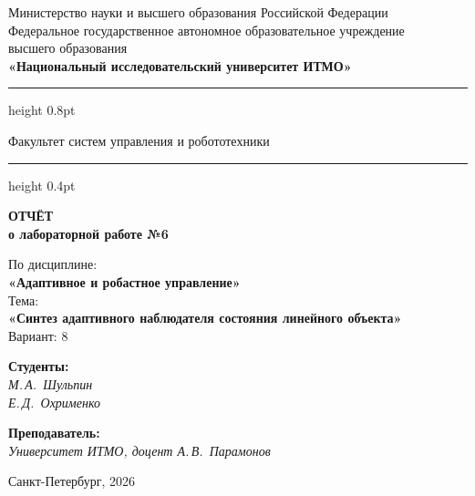 \documentclass[a4paper,12pt]{article}
\begin{document}
	
	\begin{titlepage}
		\centering
		
		\vspace*{0.5cm}
		{\small
			Министерство науки и высшего образования Российской Федерации\\[2pt]
			Федеральное государственное автономное образовательное учреждение\\
			высшего образования\\[2pt]
			\textbf{«Национальный исследовательский университет ИТМО»}\\
		}
		
		\vspace{0.8cm}
		\hrule height 0.8pt
		\vspace{0.3cm}
		
		{\large Факультет систем управления и робототехники}
		
		\vspace{0.3cm}
		\hrule height 0.4pt
		\vspace{2.5cm}
		
		{\Huge\bfseries ОТЧЁТ}\\[0.4cm]
		{\LARGE\bfseries о лабораторной работе №6}\\[0.8cm]
		
		\begin{tcolorbox}[
			colback=gray!4,
			colframe=gray!10,
			boxrule=0.8pt,
			arc=4pt,
			left=12pt, right=12pt, top=8pt, bottom=8pt
			]
			\centering
			{\large По дисциплине:\\[4pt]}
			{\large\bfseries «Адаптивное и робастное управление»}\\[10pt]
			{\large Тема:\\[4pt]}
			{\large\bfseries «Синтез адаптивного наблюдателя состояния линейного объекта»} \\[10pt]
			{\large Вариант: 8}
		\end{tcolorbox}
		\vspace{3cm}
		
		
		\begin{minipage}{0.45\textwidth}
			\raggedright
			{\large\bfseries Студенты:}\\[4pt]
			\textit{М.\,А.~Шульпин}\\
			\textit{Е.\,Д.~Охрименко}
		\end{minipage}%
		\hfill
		\begin{minipage}{0.45\textwidth}
			\raggedleft
			{\large\bfseries Преподаватель:}\\[4pt]
			\textit{Университет ИТМО, доцент \hfill А.\,В.~Парамонов}
		\end{minipage}
		
		\vfill
		\vspace{0.4cm}
		{\large Санкт-Петербург, 2026}
	\end{titlepage}
	
\end{document}
